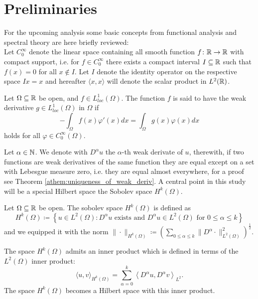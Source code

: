 \chapter{Preliminaries} \label{chap:2}

For the upcoming analysis some basic concepts from functional analysis and spectral theory are here briefly reviewed:
~\\

Let $C_{0}^{\infty}$ denote the linear space containing all smooth function $f \colon \mathbb{R} \rightarrow \mathbb{R}$ with compact support, i.e. for $f \in C_{0}^{\infty}$ there exists a compact interval $I \subseteq \mathbb{R}$ such that $f(x) = 0$ for all $x \notin I$. Let $I$ denote the identity operator on the respective space $I x = x$ and hereafter $\langle x, x \rangle$ will denote the scalar product in $L^{2}(\mathbb{R})$.
\begin{definition}
Let $\Omega \subseteq \mathbb{R}$ be open, and $f \in L^{1}_{loc}(\Omega)$. The function $f$ is said to have the weak derivative $g \in L^{1}_{loc}(\Omega)$ in $\Omega$ if
  \[ - \int_{\Omega} f(x) \varphi'(x) dx = \int_{\Omega} g(x) \varphi(x) dx \]
holds for all $\varphi \in C_{0}^{\infty}(\Omega)$.
\end{definition}
Let $\alpha \in \mathbb{N}$. We denote with $D^{\alpha} u$ the $\alpha$-th weak derivate of $u$, therewith, if two functions are weak derivatives of the same function they are equal except on a set with Lebesgue measure zero, i.e. they are equal almost everywhere, for a proof see Theorem \ref{athem:uniqueness_of_weak_deriv}. A central point in this study will be a special Hilbert space the Sobolev space $H^{k}(\Omega)$. 

\begin{definition} Let $\Omega \subseteq \mathbb{R}$ be open. The sobolev space $H^{k}(\Omega)$ is defined as
\[ H^{k}(\Omega) \coloneqq \left\{ u \in L^{2}(\Omega) : D^{\alpha} u \text{ exists and } D^{\alpha} u \in L^{2}(\Omega) \text{ for } 0 \leq \alpha \leq k \right\} \]
and we equipped it with the norm $\| \cdot \|_{H^{k}(\Omega)} \coloneqq \left( \sum_{0 \leq \alpha \leq k} \| D^{\alpha} \cdot \|_{L^{2}(\Omega)}^{2} \right)^{\frac{1}{2}}$.
\end{definition}	

The space $H^{k}(\Omega)$ admits an inner product which is defined in terms of the $L^{2}(\Omega)$ inner product:
	\[  \langle u,v \rangle_{H^{k}(\Omega)} = \sum_{\alpha=0}^{k} \left\langle D^{\alpha} u, D^{\alpha} v \right \rangle_{L^2}. \]
The space $H^{k}(\Omega)$ becomes a Hilbert space with this inner product.

